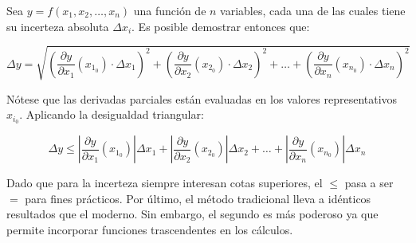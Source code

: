 \documentclass{article}
\begin{document}
Sea $y = f(x_1, x_2, \dots , x_n)$ una función de $n$ variables, cada una de las cuales tiene su incerteza absoluta $\Delta x_i$. Es posible demostrar entonces que:

\begin{equation}
\Delta y = \sqrt{ \left( \frac{\partial y}{\partial x_1}(x_{1_0}) \cdot \Delta x_1 \right)^2 + \left( \frac{\partial y}{\partial x_2}(x_{2_0}) \cdot \Delta x_2 \right)^2 + \ldots + \left( \frac{\partial y}{\partial x_n}(x_{n_0}) \cdot \Delta x_n \right)^2 }
\end{equation}

Nótese que las derivadas parciales están evaluadas en los valores representativos $x_{i_0}$. Aplicando la desigualdad triangular:

\begin{equation}
\Delta y \leq \left| \frac{\partial y}{\partial x_1}(x_{1_0}) \right| \Delta x_1 + \left| \frac{\partial y}{\partial x_2}(x_{2_0}) \right| \Delta x_2 + \ldots + \left| \frac{\partial y}{\partial x_n}(x_{n_0}) \right| \Delta x_n
\end{equation}

Dado que para la incerteza siempre interesan cotas superiores, el $\leq$ pasa a ser $=$ para fines prácticos. Por último, el método tradicional lleva a idénticos resultados que el moderno. Sin embargo, el segundo es más poderoso ya que permite incorporar funciones trascendentes en los cálculos.
\end{document}
